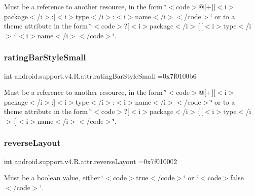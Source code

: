 Must be a reference to another resource, in the form \char`\"{}$<$code$>$@\mbox{[}+\mbox{]}\mbox{[}$<$i$>$package$<$/i$>$\+:\mbox{]}$<$i$>$type$<$/i$>$\+:$<$i$>$name$<$/i$>$$<$/code$>$\char`\"{} or to a theme attribute in the form \char`\"{}$<$code$>$?\mbox{[}$<$i$>$package$<$/i$>$\+:\mbox{]}\mbox{[}$<$i$>$type$<$/i$>$\+:\mbox{]}$<$i$>$name$<$/i$>$$<$/code$>$\char`\"{}. \mbox{\label{classandroid_1_1support_1_1v4_1_1R_1_1attr_a63f905da09e3e302af85eef728eceab0}} 
\subsubsection{\texorpdfstring{rating\+Bar\+Style\+Small}{ratingBarStyleSmall}}
{\footnotesize\ttfamily int android.\+support.\+v4.\+R.\+attr.\+rating\+Bar\+Style\+Small =0x7f0100b6\hspace{0.3cm}{\ttfamily [static]}}

Must be a reference to another resource, in the form \char`\"{}$<$code$>$@\mbox{[}+\mbox{]}\mbox{[}$<$i$>$package$<$/i$>$\+:\mbox{]}$<$i$>$type$<$/i$>$\+:$<$i$>$name$<$/i$>$$<$/code$>$\char`\"{} or to a theme attribute in the form \char`\"{}$<$code$>$?\mbox{[}$<$i$>$package$<$/i$>$\+:\mbox{]}\mbox{[}$<$i$>$type$<$/i$>$\+:\mbox{]}$<$i$>$name$<$/i$>$$<$/code$>$\char`\"{}. \mbox{\label{classandroid_1_1support_1_1v4_1_1R_1_1attr_a368d5c0e08a4db3d61d03e203a69d00b}} 
\subsubsection{\texorpdfstring{reverse\+Layout}{reverseLayout}}
{\footnotesize\ttfamily int android.\+support.\+v4.\+R.\+attr.\+reverse\+Layout =0x7f010002\hspace{0.3cm}{\ttfamily [static]}}

Must be a boolean value, either \char`\"{}$<$code$>$true$<$/code$>$\char`\"{} or \char`\"{}$<$code$>$false$<$/code$>$\char`\"{}. 

